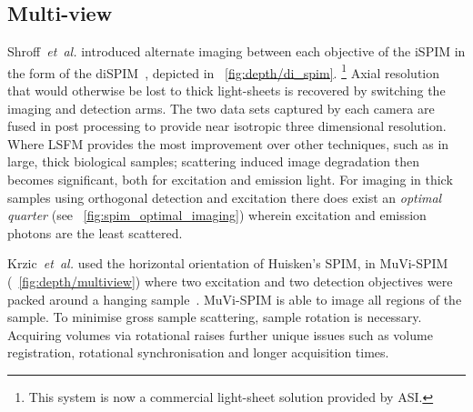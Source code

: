 \subsection{Multi-view}%

Shroff~\emph{et~al.} introduced alternate imaging between each objective of the \gls{iSPIM} in the form of the \gls{diSPIM}~\cite{kumar_dual-view_2014}, depicted in \figurename~\ref{fig:depth/di_spim}. %
\footnote{This system is now a commercial \gls{light-sheet} solution provided by ASI.}
Axial resolution that would otherwise be lost to thick \gls{light-sheet}s is recovered by switching the imaging and detection arms.
The two data sets captured by each camera are fused in post processing to provide near isotropic three dimensional resolution.
Where \gls{LSFM} provides the most improvement over other techniques, such as in large, thick biological samples;
scattering induced image degradation then becomes significant, both for excitation and emission light.
For imaging in thick samples using orthogonal detection and excitation there does exist an
\emph{optimal quarter} (see \figurename~\ref{fig:spim_optimal_imaging}) wherein excitation and emission photons are the least scattered.

Krzic~\emph{et~al.} used the horizontal orientation of Huisken's \gls{SPIM}, in \gls{MuVi-SPIM} (\figurename~\ref{fig:depth/multiview}) where two excitation and two detection objectives were packed around a hanging sample~\cite{krzicMultiviewLightsheetMicroscope2012}.
\gls{MuVi-SPIM} is able to image all regions of the sample. %
To minimise gross sample scattering, sample rotation is necessary.
Acquiring volumes via rotational  raises further unique issues such as volume registration, rotational synchronisation and longer acquisition times.

